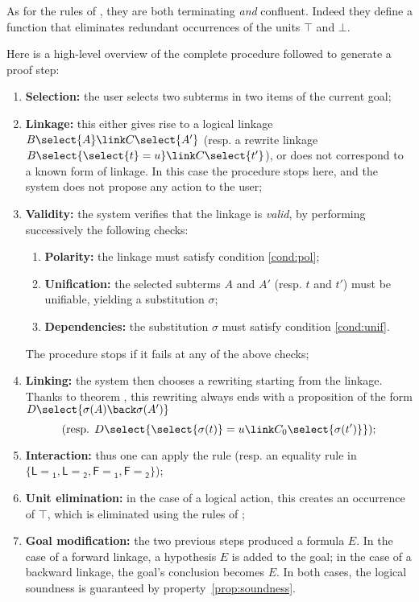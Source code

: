 As for the rules of , they are both terminating
\emph{and} confluent. Indeed they define a function that eliminates redundant
occurrences of the units $\top$ and $\bot$.

Here is a high-level overview of the complete procedure followed to generate a
proof step:
\begin{enumerate}
\item \textbf{Selection:} the user selects two subterms in two items of the current goal; \label{step:selection}
\item \textbf{Linkage:} this either gives rise to a logical linkage $B\select{A}
  \link C\select{A'}$ (resp. a rewrite linkage $B\select{\select{t} = u} \link
  C\select{t'}$), or does not correspond to a known form of linkage. In this case
  the procedure stops here, and the system does not propose any action to the
  user; \label{step:linkage}
\item \textbf{Validity:} the system verifies that the linkage is \emph{valid},
  by performing successively the following checks:
  \begin{enumerate}
    \item \textbf{Polarity:} the linkage must satisfy condition \ref{cond:pol};
    \item \textbf{Unification:} the selected subterms $A$ and $A'$ (resp. $t$
    and $t'$) must be unifiable, yielding a substitution $\sigma$;
    \item \textbf{Dependencies:} the substitution $\sigma$ must satisfy
    condition \ref{cond:unif}.
  \end{enumerate}
  The procedure stops if it fails at any of the above checks;
  \label{step:validity}
\item \textbf{Linking:} the system then chooses a rewriting start\-ing from the linkage. Thanks to
  theorem , this re\-writing always ends with a proposition of
  the form $D\select{\sigma(A) \back \sigma(A')}$ $$\text{(resp.
  $D\select{\select{\sigma(t)} = u \link C_0\select{\sigma(t')}}$);}$$
  \label{step:linking}
\item \textbf{Interaction:} thus one can apply the {} rule (resp. an equality rule in
$\{\mathsf{L\!\!=\!\!_1}, \mathsf{L\!\!=\!\!_2}, \mathsf{F\!\!=\!\!_1},
\mathsf{F\!\!=\!\!_2}\}$); \label{step:interaction}
\item \textbf{Unit elimination:} in the case of a logical action, this creates an occurrence of $\top$,
which is eliminated using the rules of ; \label{step:unit-elimination}
\item \textbf{Goal modification:} the two previous steps produced a formula $E$.
  In the case of a forward linkage, a hypothesis $E$ is added to the goal; in
  the case of a backward linkage, the goal's conclusion becomes $E$. In both
  cases, the logical soundness is guaranteed by
  property~\ref{prop:soundness}. \label{step:goal-modification}
\end{enumerate}

